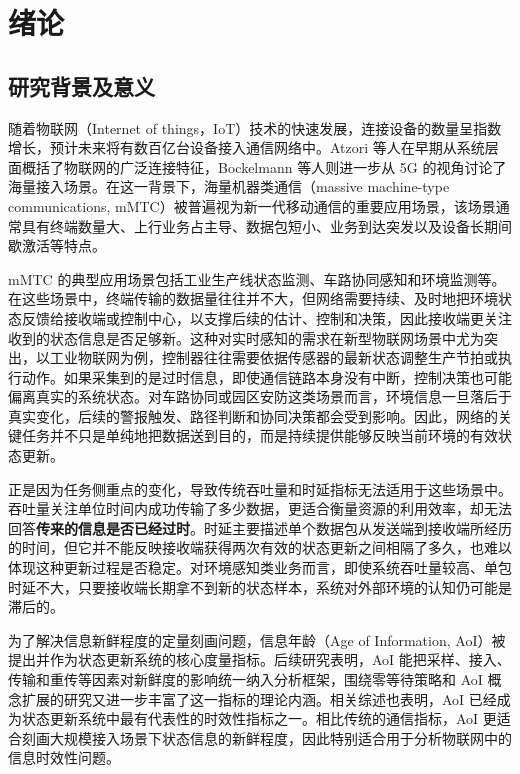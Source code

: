 \clearpage

\section{绪论}

\subsection{研究背景及意义}

随着物联网（Internet of things，IoT）技术的快速发展，连接设备的数量呈指数增长，预计未来将有数百亿台设备接入通信网络中\cite{al2015internet}。Atzori 等人在早期从系统层面概括了物联网的广泛连接特征\cite{atzori2010internet}，Bockelmann 等人则进一步从 5G 的视角讨论了海量接入场景\cite{bockelmann2016massive}。在这一背景下，海量机器类通信（massive machine-type communications, mMTC）被普遍视为新一代移动通信的重要应用场景\cite{hasan2013random}，该场景通常具有终端数量大、上行业务占主导、数据包短小、业务到达突发以及设备长期间歇激活等特点\cite{berioli2016modern}。

mMTC 的典型应用场景包括工业生产线状态监测\cite{li2017industrial}、车路协同感知\cite{bai2024survey}和环境监测\cite{oliveira2011wireless}等。在这些场景中，终端传输的数据量往往并不大，但网络需要持续、及时地把环境状态反馈给接收端或控制中心，以支撑后续的估计、控制和决策，因此接收端更关注收到的状态信息是否足够新\cite{kahraman2023age}。这种对实时感知的需求在新型物联网场景中尤为突出，以工业物联网为例，控制器往往需要依据传感器的最新状态调整生产节拍或执行动作\cite{chen2023co}。如果采集到的是过时信息，即使通信链路本身没有中断，控制决策也可能偏离真实的系统状态。对车路协同或园区安防这类场景而言，环境信息一旦落后于真实变化，后续的警报触发、路径判断和协同决策都会受到影响。因此，网络的关键任务并不只是单纯地把数据送到目的，而是持续提供能够反映当前环境的有效状态更新\cite{kaul2012status}。

正是因为任务侧重点的变化，导致传统吞吐量和时延指标无法适用于这些场景中。吞吐量关注单位时间内成功传输了多少数据，更适合衡量资源的利用效率，却无法回答\textbf{传来的信息是否已经过时}\cite{barakat2019zero}。时延主要描述单个数据包从发送端到接收端所经历的时间，但它并不能反映接收端获得两次有效的状态更新之间相隔了多久，也难以体现这种更新过程是否稳定\cite{zhang2019age}。对环境感知类业务而言，即使系统吞吐量较高、单包时延不大，只要接收端长期拿不到新的状态样本，系统对外部环境的认知仍可能是滞后的\cite{bedewy2016optimizing}。

为了解决信息新鲜程度的定量刻画问题，信息年龄（Age of Information, AoI）被提出并作为状态更新系统的核心度量指标\cite{kaul2012real,yates2012real}。后续研究表明，AoI 能把采样、接入、传输和重传等因素对新鲜度的影响统一纳入分析框架\cite{costa2016age,chen2016age}，围绕零等待策略和 AoI 概念扩展的研究又进一步丰富了这一指标的理论内涵\cite{sun2017update,kosta2017age}。相关综述也表明，AoI 已经成为状态更新系统中最有代表性的时效性指标之一\cite{yates2021age}。相比传统的通信指标，AoI 更适合刻画大规模接入场景下状态信息的新鲜程度，因此特别适合用于分析物联网中的信息时效性问题。

